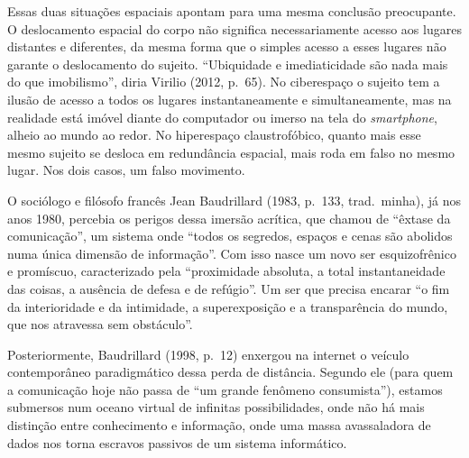 Essas duas situações espaciais apontam para uma mesma conclusão
preocupante. O deslocamento espacial do corpo não significa
necessariamente acesso aos lugares distantes e diferentes, da mesma
forma que o simples acesso a esses lugares não garante o deslocamento do
sujeito. ``Ubiquidade e imediaticidade são nada mais do que
imobilismo'', diria Virilio (2012, p.~65). No ciberespaço o sujeito tem
a ilusão de acesso a todos os lugares instantaneamente e
simultaneamente, mas na realidade está imóvel diante do computador ou
imerso na tela do \emph{smartphone}, alheio ao mundo ao redor. No
hiperespaço claustrofóbico, quanto mais esse mesmo sujeito se desloca em
redundância espacial, mais roda em falso no mesmo lugar. Nos dois casos,
um falso movimento.

O sociólogo e filósofo francês Jean Baudrillard (1983, p.~133, trad.~minha), já nos anos \label{internet} 1980, percebia os perigos dessa imersão acrítica, que chamou de ``êxtase da comunicação'', um sistema onde ``todos os segredos, espaços e cenas são abolidos numa única dimensão de informação''. Com isso nasce um novo ser esquizofrênico e promíscuo, caracterizado pela ``proximidade absoluta, a total instantaneidade das coisas, a ausência de defesa e de refúgio''. Um ser que precisa encarar ``o fim da interioridade e da intimidade, a superexposição e a transparência do mundo, que nos atravessa sem obstáculo''.

Posteriormente, Baudrillard (1998, p.~12) enxergou na internet o veículo contemporâneo paradigmático dessa perda de distância. Segundo ele (para quem a comunicação hoje não passa de ``um grande fenômeno consumista''), estamos submersos num oceano virtual de infinitas possibilidades, onde não há mais distinção entre conhecimento e informação, onde uma massa avassaladora de dados nos torna escravos passivos de um sistema informático.

